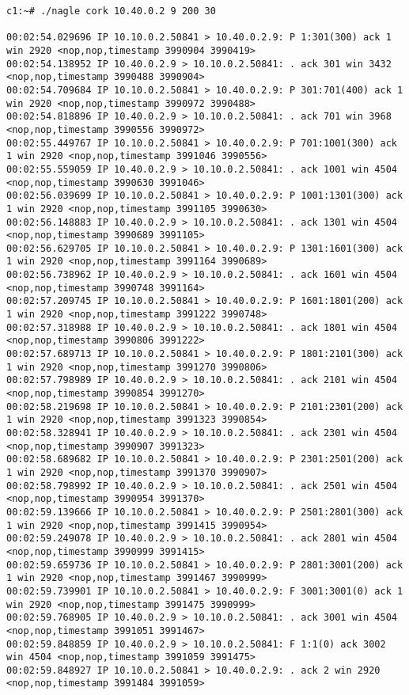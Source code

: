 \documentclass[a4paper,12pt]{article}
\begin{document}
\begin{lstlisting}
c1:~# ./nagle cork 10.40.0.2 9 200 30

00:02:54.029696 IP 10.10.0.2.50841 > 10.40.0.2.9: P 1:301(300) ack 1 win 2920 <nop,nop,timestamp 3990904 3990419>
00:02:54.138952 IP 10.40.0.2.9 > 10.10.0.2.50841: . ack 301 win 3432 <nop,nop,timestamp 3990488 3990904>
00:02:54.709684 IP 10.10.0.2.50841 > 10.40.0.2.9: P 301:701(400) ack 1 win 2920 <nop,nop,timestamp 3990972 3990488>
00:02:54.818896 IP 10.40.0.2.9 > 10.10.0.2.50841: . ack 701 win 3968 <nop,nop,timestamp 3990556 3990972>
00:02:55.449767 IP 10.10.0.2.50841 > 10.40.0.2.9: P 701:1001(300) ack 1 win 2920 <nop,nop,timestamp 3991046 3990556>
00:02:55.559059 IP 10.40.0.2.9 > 10.10.0.2.50841: . ack 1001 win 4504 <nop,nop,timestamp 3990630 3991046>
00:02:56.039699 IP 10.10.0.2.50841 > 10.40.0.2.9: P 1001:1301(300) ack 1 win 2920 <nop,nop,timestamp 3991105 3990630>
00:02:56.148883 IP 10.40.0.2.9 > 10.10.0.2.50841: . ack 1301 win 4504 <nop,nop,timestamp 3990689 3991105>
00:02:56.629705 IP 10.10.0.2.50841 > 10.40.0.2.9: P 1301:1601(300) ack 1 win 2920 <nop,nop,timestamp 3991164 3990689>
00:02:56.738962 IP 10.40.0.2.9 > 10.10.0.2.50841: . ack 1601 win 4504 <nop,nop,timestamp 3990748 3991164>
00:02:57.209745 IP 10.10.0.2.50841 > 10.40.0.2.9: P 1601:1801(200) ack 1 win 2920 <nop,nop,timestamp 3991222 3990748>
00:02:57.318988 IP 10.40.0.2.9 > 10.10.0.2.50841: . ack 1801 win 4504 <nop,nop,timestamp 3990806 3991222>
00:02:57.689713 IP 10.10.0.2.50841 > 10.40.0.2.9: P 1801:2101(300) ack 1 win 2920 <nop,nop,timestamp 3991270 3990806>
00:02:57.798989 IP 10.40.0.2.9 > 10.10.0.2.50841: . ack 2101 win 4504 <nop,nop,timestamp 3990854 3991270>
00:02:58.219698 IP 10.10.0.2.50841 > 10.40.0.2.9: P 2101:2301(200) ack 1 win 2920 <nop,nop,timestamp 3991323 3990854>
00:02:58.328941 IP 10.40.0.2.9 > 10.10.0.2.50841: . ack 2301 win 4504 <nop,nop,timestamp 3990907 3991323>
00:02:58.689682 IP 10.10.0.2.50841 > 10.40.0.2.9: P 2301:2501(200) ack 1 win 2920 <nop,nop,timestamp 3991370 3990907>
00:02:58.798992 IP 10.40.0.2.9 > 10.10.0.2.50841: . ack 2501 win 4504 <nop,nop,timestamp 3990954 3991370>
00:02:59.139666 IP 10.10.0.2.50841 > 10.40.0.2.9: P 2501:2801(300) ack 1 win 2920 <nop,nop,timestamp 3991415 3990954>
00:02:59.249078 IP 10.40.0.2.9 > 10.10.0.2.50841: . ack 2801 win 4504 <nop,nop,timestamp 3990999 3991415>
00:02:59.659736 IP 10.10.0.2.50841 > 10.40.0.2.9: P 2801:3001(200) ack 1 win 2920 <nop,nop,timestamp 3991467 3990999>
00:02:59.739901 IP 10.10.0.2.50841 > 10.40.0.2.9: F 3001:3001(0) ack 1 win 2920 <nop,nop,timestamp 3991475 3990999>
00:02:59.768905 IP 10.40.0.2.9 > 10.10.0.2.50841: . ack 3001 win 4504 <nop,nop,timestamp 3991051 3991467>
00:02:59.848859 IP 10.40.0.2.9 > 10.10.0.2.50841: F 1:1(0) ack 3002 win 4504 <nop,nop,timestamp 3991059 3991475>
00:02:59.848927 IP 10.10.0.2.50841 > 10.40.0.2.9: . ack 2 win 2920 <nop,nop,timestamp 3991484 3991059>
\end{lstlisting}
\end{document}
